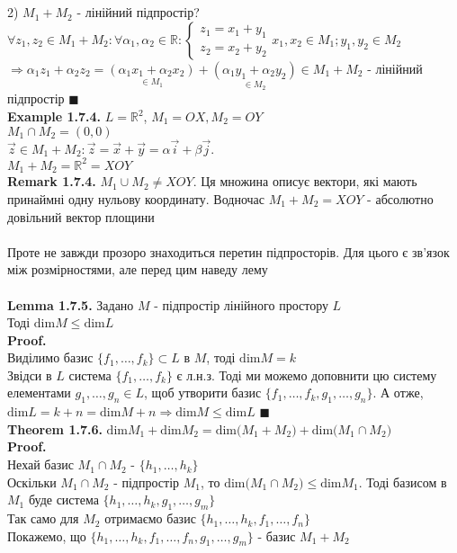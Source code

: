 \documentclass[a4paper, 14pt]{extarticle}
\def\ex#1{\textbf{Example {#1}}}
\def\rm#1{\textbf{Remark {#1}}}
\def\lm#1{\textbf{Lemma {#1}}}
\def\th#1{\textbf{Theorem {#1}}}
\def\proof{\textbf{Proof.}\\}
\def\bigline{\vspace{5mm}\\}
\def\qed{$\blacksquare$}
\def\dim#1{\textrm{dim} {#1}}
\begin{document}
	\\
	\\
	2) $M_1 + M_2$ - лінійний підпростір?\\
	$\forall z_1, z_2 \in M_1 + M_2: \forall \alpha_1, \alpha_2 \in \mathbb{R}: \begin{cases} z_1 = x_1 + y_1 \\ z_2 = x_2 + y_2 \end{cases}x_1,x_2 \in M_1; y_1, y_2 \in M_2$\\
	$\Rightarrow \alpha_1 z_1 + \alpha_2 z_2 = \underset{\in M_1}{(\alpha_1 x_1 + \alpha_2 x_2)} + \underset{\in M_2}{(\alpha_1 y_1 + \alpha_2 y_2)} \in M_1 + M_2$ - лінійний підпростір \qed
	\bigline
	\ex{1.7.4.} $L=\mathbb{R}^2$, $M_1 = OX, M_2 = OY$\\
	$M_1 \cap M_2 = (0,0)$\\
	$\vec{z} \in M_1 + M_2: \vec{z} = \vec{x} + \vec{y} = \alpha \vec{i} + \beta \vec{j}$.\\
	$M_1 + M_2 = \mathbb{R}^2 = XOY$
	\bigline
	\rm{1.7.4.} $M_1 \cup M_2 \neq XOY$. Ця множина описує вектори, які мають принаймні одну нульову координату. Водночас $M_1 + M_2 = XOY$ - абсолютно довільний вектор площини
	\\
	\\
	Проте не завжди прозоро знаходиться перетин підпросторів. Для цього є зв'язок між розмірностями, але перед цим наведу лему\\
	\\
	\lm{1.7.5.} Задано $M$ - підпростір лінійного простору $L$\\
	Тоді $\dim M \leq \dim L$\\
	\proof
	Виділимо базис $\{f_1,\dots,f_k\} \subset L$ в $M$, тоді $\dim M = k$\\
	Звідси в $L$ система $\{f_1,\dots,f_k\}$ є л.н.з. Тоді ми можемо доповнити цю систему елементами $g_1,\dots,g_n \in L$, щоб утворити базис $\{f_1,\dots,f_k,g_1,\dots,g_n\}$. А отже, $\dim L = k+n = \dim M + n \Rightarrow \dim M \leq \dim L$ \qed
	\bigline
	\th{1.7.6.} $\dim{M_1} + \dim{M_2} = \dim(M_1 + M_2) + \dim(M_1 \cap M_2)$\\
	\proof
	Нехай базис $M_1 \cap M_2$ - $\{h_1, \dots, h_k\}$\\
	Оскільки $M_1 \cap M_2$ - підпростір $M_1$, то $\dim (M_1 \cap M_2) \leq \dim M_1$. Тоді базисом в $M_1$ буде система $\{h_1, \dots, h_k, g_1, \dots, g_m\}$\\
	Так само для $M_2$ отримаємо базис $\{h_1, \dots, h_k, f_1, \dots, f_n\}$\\
	Покажемо, що $\{h_1, \dots, h_k, f_1, \dots, f_n, g_1, \dots, g_m\}$ - базис $M_1 + M_2$\\
\end{document}
